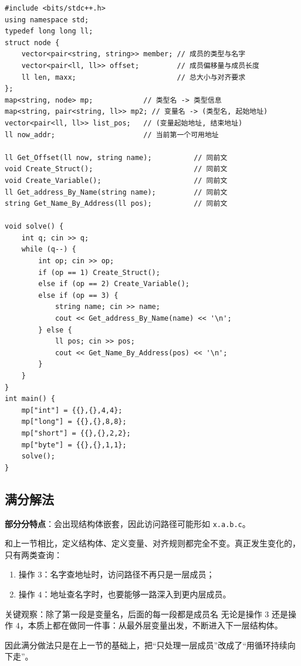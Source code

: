 \documentclass{book}
\newcommand{\code}[1]{\colorbox{codebg}{\texttt{#1}}}  %
\begin{document}
\begin{lstlisting}[style = code]
#include <bits/stdc++.h>
using namespace std;
typedef long long ll;
struct node {
    vector<pair<string, string>> member; // 成员的类型与名字
    vector<pair<ll, ll>> offset;         // 成员偏移量与成员长度
    ll len, maxx;                        // 总大小与对齐要求
};
map<string, node> mp;            // 类型名 -> 类型信息
map<string, pair<string, ll>> mp2; // 变量名 -> (类型名, 起始地址)
vector<pair<ll, ll>> list_pos;   // (变量起始地址, 结束地址)
ll now_addr;                     // 当前第一个可用地址

ll Get_Offset(ll now, string name);          // 同前文
void Create_Struct();                        // 同前文
void Create_Variable();                      // 同前文
ll Get_address_By_Name(string name);         // 同前文
string Get_Name_By_Address(ll pos);          // 同前文

void solve() {
    int q; cin >> q;
    while (q--) {
        int op; cin >> op;
        if (op == 1) Create_Struct();
        else if (op == 2) Create_Variable();
        else if (op == 3) {
            string name; cin >> name;
            cout << Get_address_By_Name(name) << '\n';
        } else {
            ll pos; cin >> pos;
            cout << Get_Name_By_Address(pos) << '\n';
        }
    }
}
int main() {
    mp["int"] = {{},{},4,4};
    mp["long"] = {{},{},8,8};
    mp["short"] = {{},{},2,2};
    mp["byte"] = {{},{},1,1};
    solve();
}\end{lstlisting}


\newpage
\subsection{满分解法}

    \textbf{部分分特点}：会出现结构体嵌套，因此访问路径可能形如 \code{x.a.b.c}。

    和上一节相比，定义结构体、定义变量、对齐规则都完全不变。真正发生变化的，只有两类查询：

    \begin{enumerate}[leftmargin=2em,itemsep=1pt,topsep=2pt,parsep=0pt,partopsep=0pt]
        \item 操作 $3$：名字查地址时，访问路径不再只是一层成员；
        \item 操作 $4$：地址查名字时，也要能够一路深入到更内层成员。
    \end{enumerate}

    \begin{keybox}{关键观察：除了第一段是变量名，后面的每一段都是成员名}
        无论是操作 $3$ 还是操作 $4$，本质上都在做同一件事：从最外层变量出发，不断进入下一层结构体。

        因此满分做法只是在上一节的基础上，把“只处理一层成员”改成了“用循环持续向下走”。
    \end{keybox}
\end{document}
